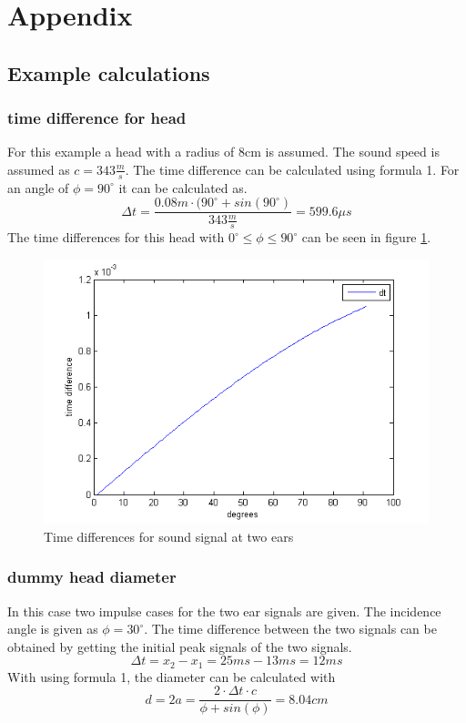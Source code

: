 \documentclass{article}
\begin{document}
\section{Appendix}
\subsection{Example calculations}
\subsubsection{time difference for head}
For this example a head with a radius of 8cm is assumed. The sound speed is assumed as $c=343\frac{m}{s}$. The time difference can be calculated using formula 1. For an angle of $\phi=90^\circ$ it can be calculated as.
$$\Delta t=\frac{0.08m\cdot(90^\circ+sin(90^\circ)}{343\frac{m}{s}}=599.6\mu s$$
The time differences for this head with $0^\circ\leq\phi\leq 90^\circ$ can be seen in figure \ref{fig:angles}.
\begin{figure}[htbp]
\begin{center}
\includegraphics[width=15cm,keepaspectratio=true]{angles}
\caption{Time differences for sound signal at two ears}
\label{fig:angles}
\end{center}
\end{figure}
\subsubsection{dummy head diameter}
In this case two impulse cases for the two ear signals are given. The incidence angle is given as $\phi=30^\circ$. The time difference between the two signals can be obtained by getting the initial peak signals of the two signals.
$$\Delta t=x_2-x_1=25ms-13ms=12ms$$
With using formula 1, the diameter can be calculated with
$$d=2a=\frac{2\cdot\Delta t\cdot c}{\phi+sin(\phi)}=8.04cm$$
\end{document}
